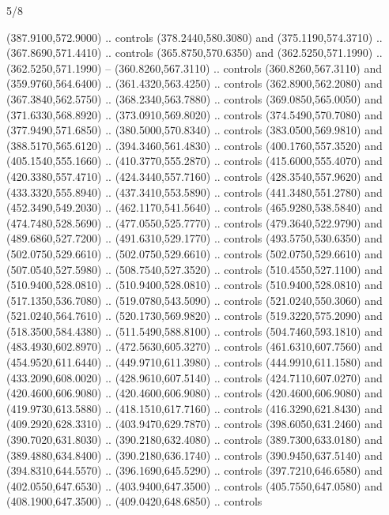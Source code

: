 \begin{flagdescription}{5/8}
\begin{scope}[shift={(m)}]
\begin{scope}[scale=\flagwidth/220,y=0.1mm, x=0.1mm, yscale=-1,shift={(-596,-360)}]
\begin{scope}[cm={{-1.0,0.0,0.0,1.0,(1193.9797,0.0)}}]
\begin{scope}[draw=black,line join=round,line cap=round,line width=0.381\lw]
\begin{scope}[line width=0.534\lw,fill=green]
\end{scope}
\begin{scope}[fill=white,line width=1.143\lw]
 (387.9100,572.9000) .. controls (378.2440,580.3080) and
  (375.1190,574.3710) .. (367.8690,571.4410) .. controls (365.8750,570.6350) and
  (362.5250,571.1990) .. (362.5250,571.1990) -- (360.8260,567.3110) .. controls
  (360.8260,567.3110) and (359.9760,564.6400) .. (361.4320,563.4250) .. controls
  (362.8900,562.2080) and (367.3840,562.5750) .. (368.2340,563.7880) .. controls
  (369.0850,565.0050) and (371.6330,568.8920) .. (373.0910,569.8020) .. controls
  (374.5490,570.7080) and (377.9490,571.6850) .. (380.5000,570.8340) .. controls
  (383.0500,569.9810) and (388.5170,565.6120) .. (394.3460,561.4830) .. controls
  (400.1760,557.3520) and (405.1540,555.1660) .. (410.3770,555.2870) .. controls
  (415.6000,555.4070) and (420.3380,557.4710) .. (424.3440,557.7160) .. controls
  (428.3540,557.9620) and (433.3320,555.8940) .. (437.3410,553.5890) .. controls
  (441.3480,551.2780) and (452.3490,549.2030) .. (462.1170,541.5640) .. controls
  (465.9280,538.5840) and (474.7480,528.5690) .. (477.0550,525.7770) .. controls
  (479.3640,522.9790) and (489.6860,527.7200) .. (491.6310,529.1770) .. controls
  (493.5750,530.6350) and (502.0750,529.6610) .. (502.0750,529.6610) .. controls
  (502.0750,529.6610) and (507.0540,527.5980) .. (508.7540,527.3520) .. controls
  (510.4550,527.1100) and (510.9400,528.0810) .. (510.9400,528.0810) .. controls
  (510.9400,528.0810) and (517.1350,536.7080) .. (519.0780,543.5090) .. controls
  (521.0240,550.3060) and (521.0240,564.7610) .. (520.1730,569.9820) .. controls
  (519.3220,575.2090) and (518.3500,584.4380) .. (511.5490,588.8100) .. controls
  (504.7460,593.1810) and (483.4930,602.8970) .. (472.5630,605.3270) .. controls
  (461.6310,607.7560) and (454.9520,611.6440) .. (449.9710,611.3980) .. controls
  (444.9910,611.1580) and (433.2090,608.0020) .. (428.9610,607.5140) .. controls
  (424.7110,607.0270) and (420.4600,606.9080) .. (420.4600,606.9080) .. controls
  (420.4600,606.9080) and (419.9730,613.5880) .. (418.1510,617.7160) .. controls
  (416.3290,621.8430) and (409.2920,628.3310) .. (403.9470,629.7870) .. controls
  (398.6050,631.2460) and (390.7020,631.8030) .. (390.2180,632.4080) .. controls
  (389.7300,633.0180) and (389.4880,634.8400) .. (390.2180,636.1740) .. controls
  (390.9450,637.5140) and (394.8310,644.5570) .. (396.1690,645.5290) .. controls
  (397.7210,646.6580) and (402.0550,647.6530) .. (403.9400,647.3500) .. controls
  (405.7550,647.0580) and (408.1900,647.3500) .. (409.0420,648.6850) .. controls

\end{scope}
\end{scope}
\end{scope}
\end{scope}
\end{scope}
\end{flagdescription}
